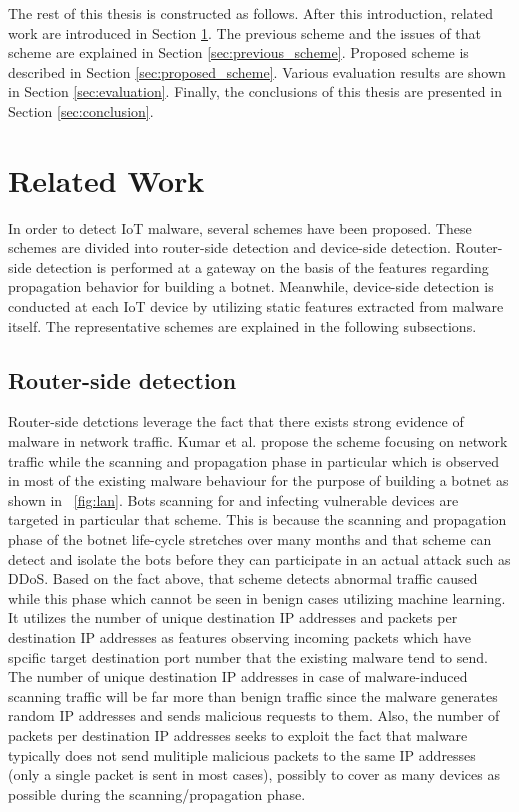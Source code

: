 \documentclass{ieeeaccess}
\begin{document}
The rest of this thesis is constructed as follows. 
After this introduction, related work are introduced in Section \ref{sec:related_work}.
The previous scheme and the issues of that scheme are explained in Section \ref{sec:previous_scheme}.
Proposed scheme is described in Section \ref{sec:proposed_scheme}.
Various evaluation results are shown in Section \ref{sec:evaluation}.
Finally, the conclusions of this thesis are presented in Section \ref{sec:conclusion}.


\section{Related Work} \label{sec:related_work}
In order to detect IoT malware, several schemes have been proposed. 
These schemes are divided into router-side detection and device-side detection.
Router-side detection is performed at a gateway on the basis of the features regarding propagation behavior for building a botnet.
Meanwhile, device-side detection is conducted at each IoT device by utilizing static features extracted from malware itself.
The representative schemes are explained in the following subsections.

\subsection{Router-side detection}
Router-side detctions leverage the fact that there exists strong evidence of malware in network traffic.
Kumar et al. \cite{net} propose the scheme focusing on network traffic while the scanning and propagation phase in particular which is observed in most of the existing malware behaviour for the purpose of building a botnet as shown in \figurename~\ref{fig:lan}.
Bots scanning for and infecting vulnerable devices are targeted in particular that scheme. 
This is because the scanning and propagation phase of the botnet life-cycle stretches over many months and that scheme can detect and isolate the bots before they can participate in an actual attack such as DDoS.
Based on the fact above, that scheme detects abnormal traffic caused while this phase which cannot be seen in benign cases utilizing machine learning.
It utilizes the number of unique destination IP addresses and packets per destination IP addresses as features observing incoming packets which have spcific target destination port number that the existing malware tend to send.
The number of unique destination IP addresses in case of malware-induced scanning traffic will be far more than benign traffic since the malware generates random IP addresses and sends malicious requests to them.
Also, the number of packets per destination IP addresses seeks to exploit the fact that malware typically does not send mulitiple malicious packets to the same IP addresses (only a single packet is sent in most cases), possibly to cover as many devices as possible during the scanning/propagation phase.
\end{document}
